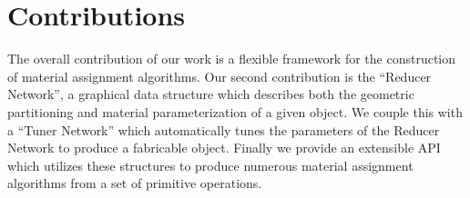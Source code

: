 \documentclass[annual]{acmsiggraph}
\begin{document}
\section{Contributions}
The overall contribution of our work is a flexible framework for the construction of material assignment algorithms. Our second contribution is the ``Reducer Network'',  a graphical data structure which describes both the geometric partitioning and material parameterization of  a given object. We couple this with a ``Tuner Network'' which automatically tunes the parameters of the Reducer Network to produce a fabricable object. Finally we provide an extensible API which utilizes these structures to produce numerous material assignment algorithms from a set of primitive operations.
\end{document}
